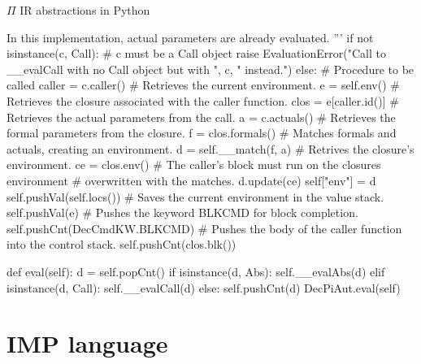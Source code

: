 \documentclass{beamer}
\begin{document}
\begin{frame}{{\color{red}$\Pi$ IR} abstractions in Python}
\begin{python}
        In this implementation, actual parameters are already evaluated.
        '''
        if not isinstance(c, Call):    # c must be a Call object
            raise EvaluationError("Call to __evalCall with no Call object but with ", c, " instead.")
        else:
            # Procedure to be called
            caller = c.caller()            
            # Retrieves the current environment.
            e = self.env()                 
            # Retrieves the closure associated with the caller function.
            clos = e[caller.id()]
            # Retrieves the actual parameters from the call.
            a = c.actuals()
            # Retrieves the formal parameters from the closure.
            f = clos.formals()
            # Matches formals and actuals, creating an environment.
            d = self.__match(f, a)
            # Retrives the closure's environment.
            ce = clos.env()      
            # The caller's block must run on the closures environment
            # overwritten with the matches.
            d.update(ce)
            self["env"] = d
            self.pushVal(self.locs())
            # Saves the current environment in the value stack.
            self.pushVal(e)
            # Pushes the keyword BLKCMD for block completion.
            self.pushCnt(DecCmdKW.BLKCMD)
            # Pushes the body of the caller function into the control stack.
            self.pushCnt(clos.blk())

    def eval(self):
        d = self.popCnt()
        if isinstance(d, Abs):
            self.__evalAbs(d)
        elif isinstance(d, Call):
            self.__evalCall(d)
        else:
            self.pushCnt(d)
            DecPiAut.eval(self)
\end{python}

\end{frame}


\section{\textsc{IMP} language}
\end{document}
